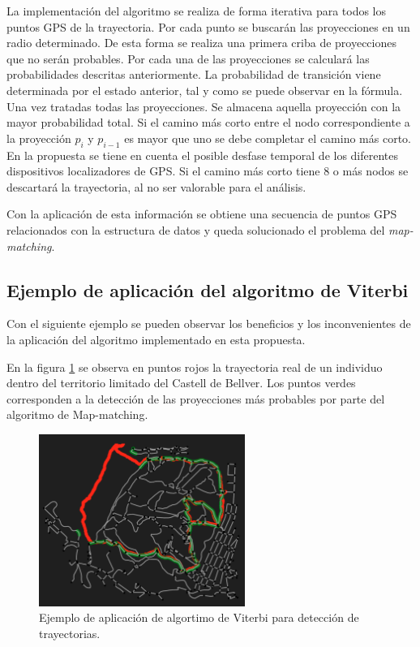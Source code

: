 La implementación del algoritmo se realiza de forma iterativa para todos los puntos \ac{GPS} de la trayectoria.
Por cada punto se buscarán las proyecciones en un radio determinado. De esta forma se realiza una primera 
criba de proyecciones que no serán probables.
Por cada una de las proyecciones se calculará las probabilidades descritas anteriormente. La probabilidad de 
transición viene determinada por el estado anterior, tal y como se puede observar en la fórmula.
Una vez tratadas todas las proyecciones. Se almacena aquella proyección con la mayor probabilidad total. Si el 
camino más corto entre el nodo correspondiente a la proyección $p_{i}$ y $p_{i-1}$ es mayor que uno se debe 
completar el camino más corto. En la propuesta se tiene en cuenta el posible desfase temporal de los diferentes 
dispositivos localizadores de \ac{GPS}. Si el camino más corto tiene 8 o más nodos se descartará la trayectoria, 
al no ser valorable para el análisis.

Con la aplicación de esta información se obtiene una secuencia de puntos \ac{GPS} relacionados con la estructura de 
datos y queda solucionado el problema del \textit{map-matching}.

\subsection{Ejemplo de aplicación del algoritmo de Viterbi}
Con el siguiente ejemplo se pueden observar los beneficios y los inconvenientes de la aplicación del algoritmo 
implementado en esta propuesta.

En la figura \ref{figure:MapMatching1} se observa en puntos rojos la trayectoria real de un individuo dentro del 
territorio limitado del Castell de Bellver. Los puntos verdes corresponden a la detección de las proyecciones 
más probables por parte del algoritmo de Map-matching.

\begin{figure}[htb]
\begin{center}
\includegraphics[width=0.6\textwidth]{./Imagenes/MapMatching1.png}
\caption{Ejemplo de aplicación de algortimo de Viterbi para detección de trayectorias.}
\label{figure:MapMatching1}
\end{center}
\end{figure}

